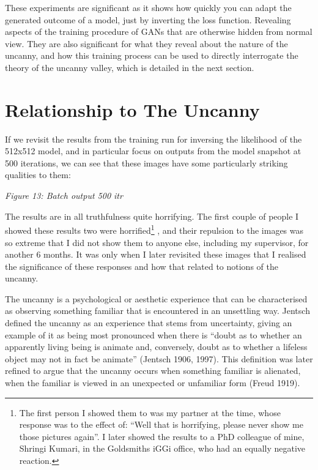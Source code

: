 These experiments are significant as it shows how quickly you can adapt the generated outcome of a model, just by inverting the loss function. 
Revealing aspects of the training procedure of GANs that are otherwise hidden from normal view. 
They are also significant for what they reveal about the nature of the uncanny, and how this training process can be used to directly interrogate the theory of the uncanny valley, which is detailed in the next section. 

\section{Relationship to The Uncanny}

If we revisit the results from the training run for inversing the likelihood of the 512x512 model, and in particular focus on outputs from the model snapshot at 500 iterations, we can see that these images have some particularly striking qualities to them:

\textit{Figure 13: Batch output 500 itr}

The results are in all truthfulness quite horrifying. 
The first couple of people I showed these results two were horrified\footnote{
    The first person I showed them to was my partner at the time, whose response was to the effect of: ``Well that is horrifying, please never show me those pictures again''. I later showed the results to a PhD colleague of mine, Shringi Kumari, in the Goldsmiths iGGi office, who had an equally negative reaction.}
, and their repulsion to the images was so extreme that I did not show them to anyone else, including my supervisor, for another 6 months. 
It was only when I later revisited these images that I realised the significance of these responses and how that related to notions of the uncanny. 

The uncanny is a psychological or aesthetic experience that can be characterised as observing something familiar that is encountered in an unsettling way. 
Jentsch defined the uncanny as an experience that stems from uncertainty, giving an example of it as being most pronounced when there is “doubt as to whether an apparently living being is animate and, conversely, doubt as to whether a lifeless object may not in fact be animate” (Jentsch 1906, 1997). 
This definition was later refined to argue that the uncanny occurs when something familiar is alienated, when the familiar is viewed in an unexpected or unfamiliar form (Freud 1919).

